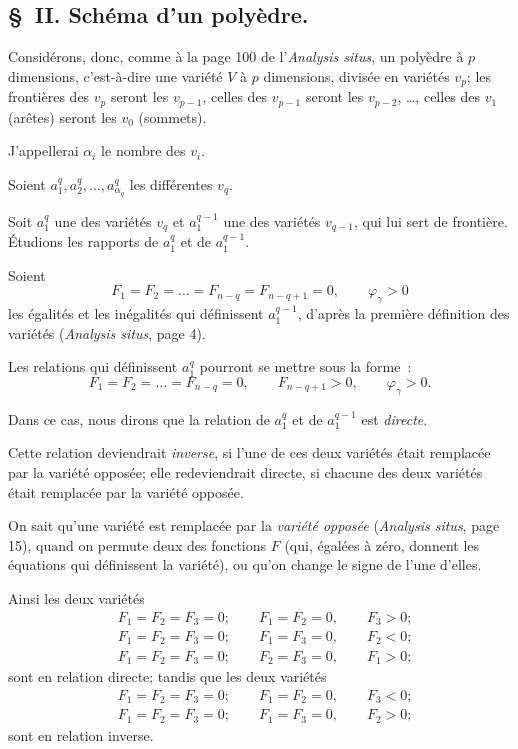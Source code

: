\documentclass{article}
\begin{document}
\subsection*{\S~II. Schéma d'un polyèdre.}

Considérons, donc, comme à la page 100 de l'\emph{Analysis situs}, un polyèdre à $p$ dimensions, c'est-à-dire une variété $V$ à $p$ dimensions, divisée en variétés $v_{p}$; les frontières des $v_{p}$ seront les $v_{p-1}$, celles des $v_{p-1}$ seront les $v_{p-2}$, \ldots, celles des $v_{1}$ (arêtes) seront les $v_{0}$ (sommets).

J'appellerai $\alpha_{i}$ le nombre des $v_{i}$.

Soient $a^{q}_{1}, a^{q}_{2}, \ldots, a^{q}_{\alpha_{q}}$ les différentes $v_{q}$.

Soit $a^{q}_{1}$ une des variétés $v_{q}$ et $a^{q-1}_{1}$ une des variétés $v_{q-1}$, qui lui sert de frontière. Étudions les rapports de $a^{q}_{1}$ et de $a^{q-1}_{1}$.

Soient
\[ F_{1} = F_{2} = \ldots = F_{n-q} = F_{n-q+1} = 0, \qquad \varphi_{\gamma} > 0 \tag{1} \]
les égalités et les inégalités qui définissent $a^{q-1}_{1}$, d'après la première définition des variétés (\emph{Analysis situs}, page 4).

Les relations qui définissent $a^{q}_{1}$ pourront se mettre sous la forme~:
\[ F_{1} = F_{2} = \ldots = F_{n-q} = 0, \qquad F_{n-q+1} > 0, \qquad \varphi_{\gamma} > 0. \tag{2} \]

Dans ce cas, nous dirons que la relation de $a^{q}_{1}$ et de $a^{q-1}_{1}$ est \emph{directe}.

Cette relation deviendrait \emph{inverse}, si l'une de ces deux variétés était remplacée par la variété opposée; elle redeviendrait directe, si chacune des deux variétés était remplacée par la variété opposée.


On sait qu'une variété est remplacée par la \emph{variété opposée} (\emph{Analysis situs}, page 15), quand on permute deux des fonctions $F$ (qui, égalées à zéro, donnent les équations qui définissent la variété), ou qu'on change le signe de l'une d'elles.

Ainsi les deux variétés
\[ \begin{aligned} &F_{1} = F_{2} = F_{3} = 0; \qquad F_{1} = F_{2} = 0, \qquad F_{3} > 0;\\ &F_{1} = F_{2} = F_{3} = 0; \qquad F_{1} = F_{3} = 0, \qquad F_{2} < 0;\\ &F_{1} = F_{2} = F_{3} = 0; \qquad F_{2} = F_{3} = 0, \qquad F_{1} > 0; \end{aligned} \]
sont en relation directe; tandis que les deux variétés
\[ \begin{aligned} &F_{1} = F_{2} = F_{3} = 0; \qquad F_{1} = F_{2} = 0, \qquad F_{3} < 0;\\ &F_{1} = F_{2} = F_{3} = 0; \qquad F_{1} = F_{3} = 0, \qquad F_{2} > 0; \end{aligned} \]
sont en relation inverse.
\end{document}
